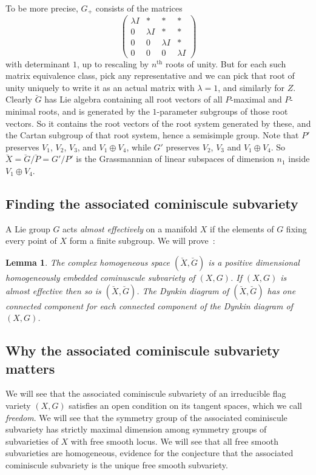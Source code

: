 \documentclass[a4paper,10pt]{amsart}
\newtheorem{lemma}{Lemma}
\theoremstyle{remark}
\begin{document}
To be more precise, \(G_+\) consists of the matrices 
\[
\begin{pmatrix}
\lambda I&*&*&*\\
0&\lambda I&*&*\\
0&0&\lambda I&*\\
0&0&0&\lambda I
\end{pmatrix}
\]
with determinant \(1\), up to rescaling by \(n^{\text{th}}\) roots of unity.
But for each such matrix equivalence class, pick any representative and we can pick that root of unity uniquely to write it as an actual matrix with \(\lambda=1\), and similarly for \(Z\).
Clearly \(\breve{G}\) has Lie algebra containing all root vectors of all \(P\)-maximal and \(P\)-minimal roots, and is generated by the \(1\)-parameter subgroups of those root vectors.
So it contains the root vectors of the root system generated by these, and the Cartan subgroup of that root system, hence a semisimple group.
Note that \(P'\) preserves \(V_1\), \(V_2\), \(V_3\), and \(V_1\oplus V_4\), while
\(G'\) preserves \(V_2\), \(V_3\) and \(V_1\oplus V_4\).
So \(\breve{X}=\breve{G}/\breve{P}=G'/P'\) is the Grassmannian of linear subspaces of dimension \(n_1\) inside \(V_1\oplus V_4\).

\subsection{Finding the associated cominiscule subvariety}
A Lie group \(G\) acts \emph{almost effectively} on a manifold \(X\) if the elements of \(G\) fixing every point of \(X\) form a finite subgroup. 
We will prove~:
\begin{lemma}\label{lemma:associated.cominuscule}
The complex homogeneous space \((\breve{X},\breve{G})\) is a positive dimensional homogeneously embedded cominuscule subvariety of \((X,G)\).
If \((X,G)\) is almost effective then so is \((\breve{X},\breve{G})\).
The Dynkin diagram of \((\breve{X},\breve{G})\) has one connected component for each connected component of the Dynkin diagram of \((X,G)\).
\end{lemma}
\subsection{Why the associated cominiscule subvariety matters}
We will see  that the associated cominiscule subvariety of an irreducible flag variety \((X,G)\) satisfies an open condition on its tangent spaces, which we call \emph{freedom}.
We will see that the symmetry group of the associated cominiscule subvariety has strictly maximal dimension among symmetry groups of subvarieties of \(X\) with free smooth locus.
We will see that all free smooth subvarieties are homogeneous, evidence for the conjecture that the associated cominiscule subvariety is the unique free smooth subvariety.
\end{document}
